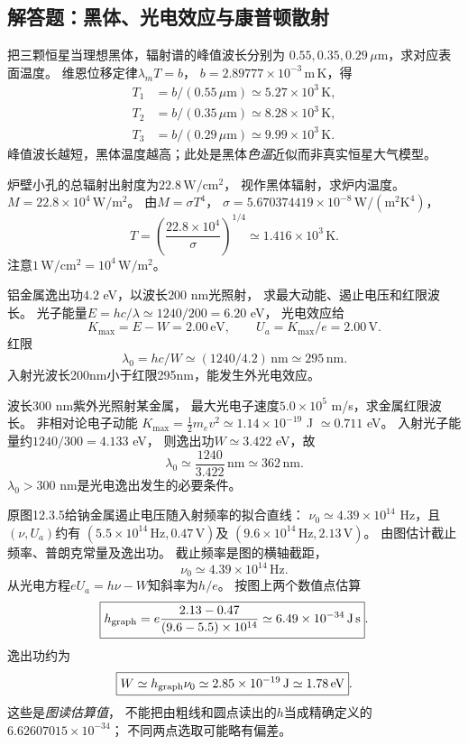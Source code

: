 \subsection{解答题：黑体、光电效应与康普顿散射}

\problemtext 把三颗恒星当理想黑体，辐射谱的峰值波长分别为
$0.55,0.35,0.29\,\mu$m，求对应表面温度。
\workings
维恩位移定律$\lambda_mT=b$，
$b=2.89777\times10^{-3}\,\mathrm{m\,K}$，得
\[
\boxed{\begin{aligned}
T_1&=b/(0.55\,\mu\mathrm m)\simeq5.27\times10^3\,\mathrm K,\\
T_2&=b/(0.35\,\mu\mathrm m)\simeq8.28\times10^3\,\mathrm K,\\
T_3&=b/(0.29\,\mu\mathrm m)\simeq9.99\times10^3\,\mathrm K.
\end{aligned}}
\]
\crosscheck 峰值波长越短，黑体温度越高；此处是黑体\emph{色温}近似而非真实恒星大气模型。

\problemtext 炉壁小孔的总辐射出射度为$22.8\,\mathrm{W/cm^2}$，
视作黑体辐射，求炉内温度。
\workings
$M=22.8\times10^4\,\mathrm{W/m^2}$。
由$M=\sigma T^4$，
$\sigma=5.670374419\times10^{-8}\,\mathrm{W/(m^2K^4)}$，
\[
\boxed{T=\left(\frac{22.8\times10^4}{\sigma}\right)^{1/4}
\simeq1.416\times10^3\,\mathrm K}.
\]
\crosscheck 注意$1\,\mathrm{W/cm^2}=10^4\,\mathrm{W/m^2}$。

\problemtext 铝金属逸出功$4.2$ eV，以波长$200$ nm光照射，
求最大动能、遏止电压和红限波长。
\workings
光子能量$E=hc/\lambda\simeq1240/200=6.20$ eV，
光电效应给
\[
\boxed{K_{\max}=E-W=2.00\,\mathrm{eV}},\qquad
\boxed{U_a=K_{\max}/e=2.00\,\mathrm V}.
\]
红限
\[
\boxed{\lambda_0=hc/W\simeq(1240/4.2)\,\mathrm{nm}
\simeq295\,\mathrm{nm}}.
\]
\crosscheck 入射光波长200nm小于红限295nm，能发生外光电效应。

\problemtext 波长$300$ nm紫外光照射某金属，
最大光电子速度$5.0\times10^5$ m/s，求金属红限波长。
\workings
非相对论电子动能
$K_{\max}=\tfrac12m_ev^2\simeq1.14\times10^{-19}$ J
$\simeq0.711$ eV。
入射光子能量约$1240/300=4.133$ eV，
则逸出功$W\simeq3.422$ eV，故
\[
\boxed{\lambda_0\simeq\frac{1240}{3.422}\,\mathrm{nm}
\simeq362\,\mathrm{nm}}.
\]
\crosscheck $\lambda_0>300$ nm是光电逸出发生的必要条件。

\problemtext 原图12.3.5给钠金属遏止电压随入射频率的拟合直线：
$\nu_0\simeq4.39\times10^{14}$ Hz，且$(\nu,U_a)$约有
$(5.5\times10^{14}\,\mathrm{Hz},0.47\,\mathrm V)$及
$(9.6\times10^{14}\,\mathrm{Hz},2.13\,\mathrm V)$。
由图估计截止频率、普朗克常量及逸出功。
\workings
截止频率是图的横轴截距，
\[
\boxed{\nu_0\simeq4.39\times10^{14}\,\mathrm{Hz}}.
\]
从光电方程$eU_a=h\nu-W$知斜率为$h/e$。
按图上两个数值点估算
\[
\boxed{h_{\rm graph}
=e\frac{2.13-0.47}{(9.6-5.5)\times10^{14}}
\simeq6.49\times10^{-34}\,\mathrm{J\,s}}.
\]
逸出功约为
\[
\boxed{W\simeq h_{\rm graph}\nu_0
\simeq2.85\times10^{-19}\,\mathrm J
\simeq1.78\,\mathrm{eV}}.
\]
\crosscheck 这些是\emph{图读估算值}，
不能把由粗线和圆点读出的$h$当成精确定义的$6.62607015\times10^{-34}$；
不同两点选取可能略有偏差。

